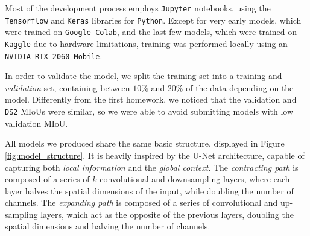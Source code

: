 \documentclass[11pt]{article}
\begin{document}
\begin{multicols}{2}


      Most of the development process employs \texttt{Jupyter} notebooks, using the \texttt{Tensorflow}\cite{TensorFlow} and \texttt{Keras}\cite{chollet2015keras} libraries for \texttt{Python}. Except for very early models, which were trained on \texttt{Google Colab}, and the last few models, which were trained on \texttt{Kaggle} due to hardware limitations, training was performed locally using an \texttt{NVIDIA RTX 2060 Mobile}.

      In order to validate the model, we split the training set into a training and \textit{validation} set, containing between $10\%$ and $20\%$ of the data depending on the model. Differently from the first homework, we noticed that the validation and \texttt{DS2} MIoUs were similar, so we were able to avoid submitting models with low validation MIoU.

      All models we produced share the same basic structure, displayed in Figure \ref{fig:model_structure}. It is heavily inspired by the U-Net\cite{ronneberger2015unetconvolutionalnetworksbiomedical} architecture, capable of capturing both \textit{local information} and the \textit{global context}. The \textit{contracting path} is composed of a series of $k$ convolutional and downsampling layers, where each layer halves the spatial dimensions of the input, while doubling the number of channels. The \textit{expanding path} is composed of a series of convolutional and up-sampling layers, which act as the opposite of the previous layers, doubling the spatial dimensions and halving the number of channels. 


\end{multicols}
\end{document}
